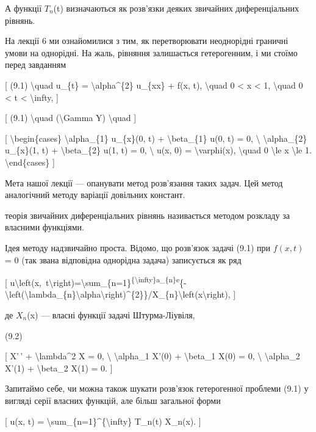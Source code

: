 \documentclass[
]{article}
\begin{document}
А функції \(T_n\)(t) визначаються як розв'язки деяких звичайних
диференціальних рівнянь.

На лекції 6 ми ознайомилися з тим, як перетворювати неоднорідні граничні
умови на однорідні. На жаль, рівняння залишається гетерогенним, і ми
стоїмо перед завданням

{[} (9.1) \textbackslash quad u\_\{t\} = \textbackslash alpha\^{}\{2\}
u\_\{xx\} + f(x, t), \textbackslash quad 0 \textless{} x \textless{} 1,
\textbackslash quad 0 \textless{} t \textless{} \textbackslash infty,
{]}

{[} (9.1) \textbackslash quad (\textbackslash Gamma Y)
\textbackslash quad {]}

{[} \textbackslash begin\{cases\} \textbackslash alpha\_\{1\}
u\_\{x\}(0, t) + \textbackslash beta\_\{1\} u(0, t) = 0,
\textbackslash{} \textbackslash alpha\_\{2\} u\_\{x\}(1, t) +
\textbackslash beta\_\{2\} u(1, t) = 0, \textbackslash{} u(x, 0) =
\textbackslash varphi(x), \textbackslash quad 0 \textbackslash le x
\textbackslash le 1. \textbackslash end\{cases\} {]}

Мета нашої лекції --- опанувати метод розв'язання таких задач. Цей метод
аналогічний методу варіації довільних констант.

теорія звичайних диференціальних рівнянь називається методом розкладу за
власними функціями.

Ідея методу надзвичайно проста. Відомо, що розв'язок задачі (9.1) при
\(f(x, t)\) = 0 (так звана відповідна однорідна задача) записується як
ряд

{[}
u\textbackslash left(x,~t\textbackslash right)=\textbackslash sum\_\{n=1\}\textsuperscript{\{\textbackslash infty\}a\_\{n\}e}\{-\textbackslash left(\textbackslash lambda\_\{n\}\textbackslash alpha\textbackslash right)\^{}\{2\}\}/X\_\{n\}\textbackslash left(x\textbackslash right),
{]}

де \(X_n\)(x) --- власні функції задачі Штурма-Ліувіля,

(9.2)

{[} X'\,' + \textbackslash lambda\^{}2 X = 0, \textbackslash{}
\textbackslash alpha\_1 X'(0) + \textbackslash beta\_1 X(0) = 0,
\textbackslash{} \textbackslash alpha\_2 X'(1) + \textbackslash beta\_2
X(1) = 0. {]}

Запитаймо себе, чи можна також шукати розв'язок гетерогенної проблеми
(9.1) у вигляді серії власних функцій, але більш загальної форми

{[} u(x, t) = \textbackslash sum\_\{n=1\}\^{}\{\textbackslash infty\}
T\_n(t) X\_n(x). {]}
\end{document}
